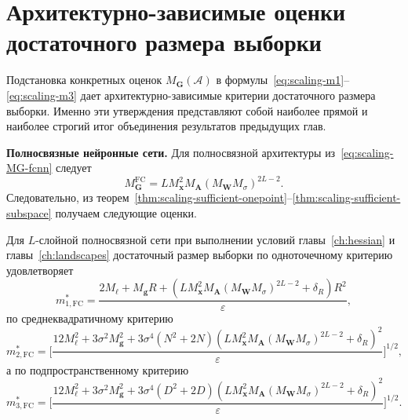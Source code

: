 \section{Архитектурно-зависимые оценки достаточного размера выборки}

Подстановка конкретных оценок $M_{\mathbf G}(\mathcal A)$ в формулы~\eqref{eq:scaling-m1}--\eqref{eq:scaling-m3} дает архитектурно-зависимые критерии достаточного размера выборки. Именно эти утверждения представляют собой наиболее прямой и наиболее строгий итог объединения результатов предыдущих глав.

\textbf{Полносвязные нейронные сети.} Для полносвязной архитектуры из~\eqref{eq:scaling-MG-fcnn} следует
\begin{equation}
    M_{\mathbf G}^{\mathrm{FC}}
    =
    L M_{\mathbf x}^2 M_{\mathbf A}(M_{\mathbf W}M_{\sigma})^{2L-2}.
\end{equation}
Следовательно, из теорем~\ref{thm:scaling-sufficient-onepoint}--\ref{thm:scaling-sufficient-subspace} получаем следующие оценки.

\begin{corollary}
    \label{cor:scaling-fcnn-sizes}
    Для $L$-слойной полносвязной сети при выполнении условий главы~\ref{ch:hessian} и главы~\ref{ch:landscapes} достаточный размер выборки по одноточечному критерию удовлетворяет
    \begin{equation}
        \label{eq:scaling-fcnn-m1}
        m_{1,\mathrm{FC}}^*
        =
        \frac{
            2M_{\ell}
            +
            M_{\mathbf g}R
            +
            \left(
                L M_{\mathbf x}^2 M_{\mathbf A}(M_{\mathbf W}M_{\sigma})^{2L-2}
                +\delta_R
            \right)R^2
        }{\varepsilon},
    \end{equation}
    по среднеквадратичному критерию
    \begin{equation}
        \label{eq:scaling-fcnn-m2}
        m_{2,\mathrm{FC}}^*
        =
        \Bigg[
            \frac{
                12M_{\ell}^2
                +
                3\sigma^2 M_{\mathbf g}^2
                +
                3\sigma^4(N^2+2N)
                \left(
                    L M_{\mathbf x}^2 M_{\mathbf A}(M_{\mathbf W}M_{\sigma})^{2L-2}
                    +\delta_R
                \right)^2
            }{\varepsilon}
        \Bigg]^{1/2},
    \end{equation}
    а по подпространственному критерию
    \begin{equation}
        \label{eq:scaling-fcnn-m3}
        m_{3,\mathrm{FC}}^*
        =
        \Bigg[
            \frac{
                12M_{\ell}^2
                +
                3\sigma^2 M_{\mathbf g}^2
                +
                3\sigma^4(D^2+2D)
                \left(
                    L M_{\mathbf x}^2 M_{\mathbf A}(M_{\mathbf W}M_{\sigma})^{2L-2}
                    +\delta_R
                \right)^2
            }{\varepsilon}
        \Bigg]^{1/2}.
    \end{equation}
\end{corollary}

